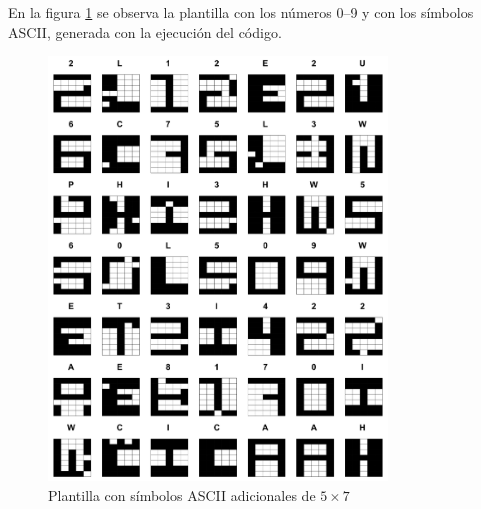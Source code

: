 \documentclass[12pt, letterpaper] {article}
\begin{document}
En la figura \ref{Plant} se observa la plantilla con los números 0--9 y con los símbolos ASCII, generada con la ejecución del código.

\begin{figure}[H]
\centering\includegraphics[width=90mm]{plantilla.png}
\caption{Plantilla con símbolos ASCII adicionales de $5\times7$}
\label{Plant}
\end{figure}






\end{document}
